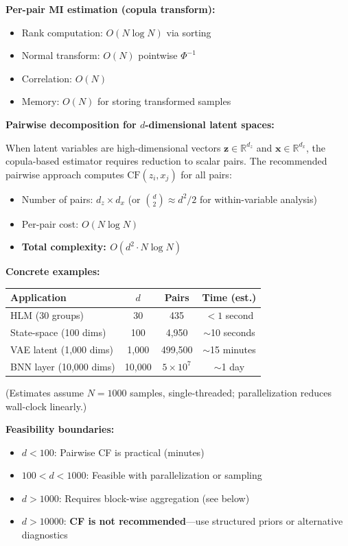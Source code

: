 \documentclass[10pt]{article} %
\theoremstyle{plain}
\theoremstyle{definition}
\begin{document}
\begin{tcolorbox}[breakable, colback=gray!5, colframe=black!75, title=\textbf{Computational Complexity of CF Estimation}, fonttitle=\bfseries]
\textbf{Per-pair MI estimation (copula transform):}
\begin{itemize}
    \item Rank computation: $O(N \log N)$ via sorting
    \item Normal transform: $O(N)$ pointwise $\Phi^{-1}$
    \item Correlation: $O(N)$
    \item Memory: $O(N)$ for storing transformed samples
\end{itemize}

\textbf{Pairwise decomposition for $d$-dimensional latent spaces:}

When latent variables are high-dimensional vectors $\mathbf{z} \in \mathbb{R}^{d_z}$ and $\mathbf{x} \in \mathbb{R}^{d_x}$, the copula-based estimator requires reduction to scalar pairs. The recommended pairwise approach computes $\text{CF}(z_i, x_j)$ for all pairs:
\begin{itemize}
    \item Number of pairs: $d_z \times d_x$ (or $\binom{d}{2} \approx d^2/2$ for within-variable analysis)
    \item Per-pair cost: $O(N \log N)$
    \item \textbf{Total complexity: $O(d^2 \cdot N \log N)$}
\end{itemize}

\textbf{Concrete examples:}
\begin{center}
\begin{tabular}{lccc}
\toprule
Application & $d$ & Pairs & Time (est.) \\
\midrule
HLM (30 groups) & 30 & 435 & $<1$ second \\
State-space (100 dims) & 100 & 4,950 & $\sim$10 seconds \\
VAE latent (1,000 dims) & 1,000 & 499,500 & $\sim$15 minutes \\
BNN layer (10,000 dims) & 10,000 & $5 \times 10^7$ & $\sim$1 day \\
\bottomrule
\end{tabular}
\end{center}
(Estimates assume $N = 1000$ samples, single-threaded; parallelization reduces wall-clock linearly.)

\textbf{Feasibility boundaries:}
\begin{itemize}
    \item $d < 100$: Pairwise CF is practical (minutes)
    \item $100 < d < 1000$: Feasible with parallelization or sampling
    \item $d > 1000$: Requires block-wise aggregation (see below)
    \item $d > 10000$: \textbf{CF is not recommended}---use structured priors or alternative diagnostics
\end{itemize}


\end{tcolorbox}
\end{document}
